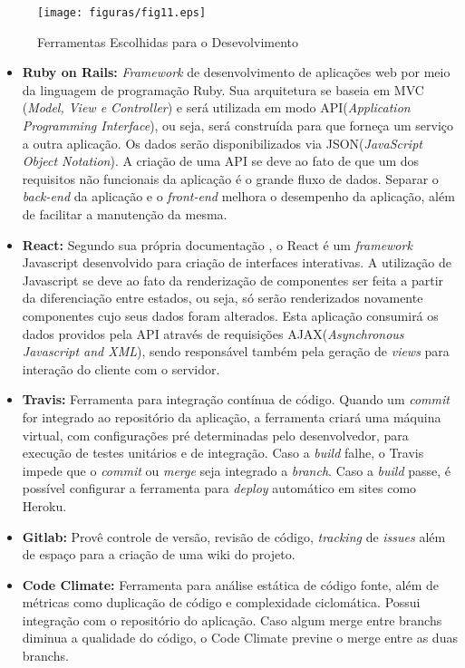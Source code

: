 \begin{figure}[ht]
	\centering
	\texttt{[image: figuras/fig11.eps]}
	\caption{Ferramentas Escolhidas para o Desevolvimento}
	\label{fig11}
\end{figure}

\begin{itemize}

  \item \textbf{Ruby on Rails:} \textit{Framework} de desenvolvimento de aplicações web por meio da linguagem de programação Ruby. Sua arquitetura se baseia em MVC (\textit{Model, View e Controller}) e será utilizada em modo API(\textit{Application Programming Interface}), ou seja, será construída para que forneça um serviço a outra aplicação. Os dados serão disponibilizados via JSON(\textit{JavaScript Object Notation}). A criação de uma API se deve ao fato de que um dos requisitos não funcionais da aplicação é o grande fluxo de dados. Separar o \textit{back-end} da aplicação e o \textit{front-end} melhora o desempenho da aplicação, além de facilitar a manutenção da mesma.

  \item \textbf{React:} Segundo sua própria documentação \cite{React:2014}, o React é um \textit{framework} Javascript desenvolvido para criação de interfaces interativas. A utilização de Javascript se deve ao fato da renderização de componentes ser feita a partir da diferenciação entre estados, ou seja, só serão renderizados novamente componentes cujo seus dados foram alterados. Esta aplicação consumirá os dados providos pela API através de requisições AJAX(\textit{Asynchronous Javascript and XML}), sendo responsável também pela geração de \textit{views} para interação do cliente com o servidor.

  \item \textbf{Travis:} Ferramenta para integração contínua de código. Quando um \textit{commit} for integrado ao repositório da aplicação, a ferramenta criará uma máquina virtual, com configurações pré determinadas pelo desenvolvedor, para execução de testes unitários e de integração. Caso a \textit{build} falhe, o Travis impede que o \textit{commit} ou \textit{merge} seja integrado a \textit{branch}. Caso a \textit{build} passe, é possível configurar a ferramenta para \textit{deploy} automático em sites como Heroku.

  \item \textbf{Gitlab:} Provê controle de versão, revisão de código, \textit{tracking} de \textit{issues} além de espaço para a criação de uma wiki do projeto.

  \item \textbf{Code Climate:} Ferramenta para análise estática de código fonte, além de métricas como duplicação de código e complexidade ciclomática. Possui integração com o repositório do aplicação. Caso algum merge entre branchs diminua a qualidade do código, o Code Climate previne o merge entre as duas branchs.

\end{itemize}

